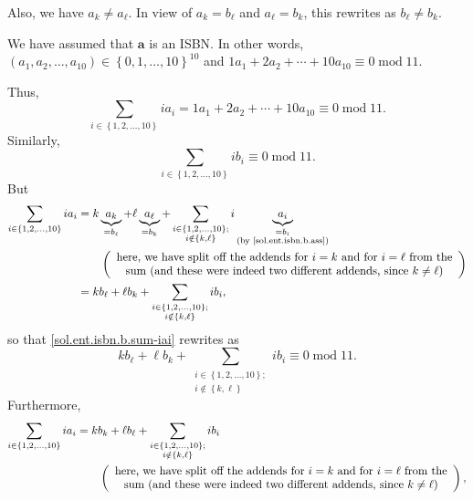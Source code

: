 \documentclass[paper=a4, fontsize=12pt]{scrartcl}%
\let\sumnonlimits\sum
\renewcommand{\sum}{\sumnonlimits\limits}
\theoremstyle{plainsl}
\theoremstyle{definition}
\theoremstyle{remark}
\begin{document}
Also, we have $a_{k}\neq a_{\ell}$. In view of $a_{k}=b_{\ell}$ and $a_{\ell
}=b_{k}$, this rewrites as $b_{\ell}\neq b_{k}$.

We have assumed that $\mathbf{a}$ is an ISBN. In other words, $\left(
a_{1},a_{2},\ldots,a_{10}\right)  \in\left\{  0,1,\ldots,10\right\}  ^{10}$
and $1a_{1}+2a_{2}+\cdots+10a_{10}\equiv0\operatorname{mod}11$.

Thus,%
\begin{equation}
\sum_{i\in\left\{  1,2,\ldots,10\right\}  }ia_{i}=1a_{1}+2a_{2}+\cdots
+10a_{10}\equiv0\operatorname{mod}11. \label{sol.ent.isbn.b.sum-iai}%
\end{equation}
Similarly,%
\begin{equation}
\sum_{i\in\left\{  1,2,\ldots,10\right\}  }ib_{i}\equiv0\operatorname{mod}11.
\label{sol.ent.isbn.b.sum-ibi}%
\end{equation}
But%
\begin{align*}
\sum_{i\in\left\{  1,2,\ldots,10\right\}  }ia_{i}  &  =k\underbrace{a_{k}%
}_{=b_{\ell}}+\ell\underbrace{a_{\ell}}_{=b_{k}}+\sum_{\substack{i\in\left\{
1,2,\ldots,10\right\}  ;\\i\notin\left\{  k,\ell\right\}  }}i\underbrace{a_{i}%
}_{\substack{=b_{i}\\\text{(by \eqref{sol.ent.isbn.b.ass})}}}\\
&  \qquad\left(
\begin{array}
[c]{c}%
\text{here, we have split off the addends for }i=k\text{ and for }i=\ell\text{
from the}\\
\text{sum (and these were indeed two different addends, since }k\neq
\ell\text{)}%
\end{array}
\right) \\
&  =kb_{\ell}+\ell b_{k}+\sum_{\substack{i\in\left\{  1,2,\ldots,10\right\}
;\\i\notin\left\{  k,\ell\right\}  }}ib_{i},
\end{align*}
so that \eqref{sol.ent.isbn.b.sum-iai} rewrites as%
\begin{equation}
kb_{\ell}+\ell b_{k}+\sum_{\substack{i\in\left\{  1,2,\ldots,10\right\}
;\\i\notin\left\{  k,\ell\right\}  }}ib_{i}\equiv0\operatorname{mod}11.
\label{sol.ent.isbn.b.sum-iai2}%
\end{equation}
Furthermore,%
\begin{align*}
\sum_{i\in\left\{  1,2,\ldots,10\right\}  }ia_{i}  &  =kb_{k}+\ell b_{\ell
}+\sum_{\substack{i\in\left\{  1,2,\ldots,10\right\}  ;\\i\notin\left\{
k,\ell\right\}  }}ib_{i}\\
&  \qquad\left(
\begin{array}
[c]{c}%
\text{here, we have split off the addends for }i=k\text{ and for }i=\ell\text{
from the}\\
\text{sum (and these were indeed two different addends, since }k\neq
\ell\text{)}%
\end{array}
\right)  ,
\end{align*}
\end{document}
